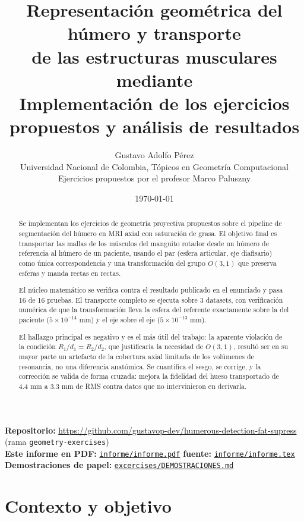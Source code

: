 \documentclass[11pt,a4paper]{article}
\title{\vspace{-1.5cm}\textbf{Representación geométrica del húmero y transporte\\
de las estructuras musculares mediante \Ot}\\[0.35cm]
\large Implementación de los ejercicios propuestos y análisis de resultados}
\author{Gustavo Adolfo Pérez\\
\small Universidad Nacional de Colombia, Tópicos en Geometría Computacional\\
\small Ejercicios propuestos por el profesor Marco Paluszny}
\date{\today}
\newcommand{\ghrepo}{https://github.com/gustavop-dev/humerous-detection-fat-supress}
\newcommand{\ghbranch}{geometry-exercises}
\newcommand{\ghblob}{\ghrepo/blob/\ghbranch}
\newcommand{\ghl}[2]{\href{\ghblob/#1}{#2}}
\newcommand{\Ot}{\ensuremath{O(3,1)}}
\begin{document}
\maketitle

\begin{abstract}
\noindent
Se implementan los ejercicios de geometría proyectiva propuestos sobre el pipeline de
segmentación del húmero en MRI axial con saturación de grasa. El objetivo final es
transportar las mallas de los músculos del manguito rotador desde un húmero de referencia
al húmero de un paciente, usando el par (esfera articular, eje diafisario) como única
correspondencia y una transformación del grupo \Ot{} que preserva esferas y manda rectas
en rectas.

El núcleo matemático se verifica contra el resultado publicado en el enunciado y pasa
16 de 16 pruebas. El transporte completo se ejecuta sobre 3 datasets, con verificación
numérica de que la transformación lleva la esfera del referente exactamente sobre la del
paciente ($5\times10^{-14}$ mm) y el eje sobre el eje ($5\times10^{-13}$ mm).

El hallazgo principal es negativo y es el más útil del trabajo: la aparente violación de
la condición $R_1/d_1 = R_2/d_2$, que justificaría la necesidad de \Ot{}, resultó ser
en su mayor parte un artefacto de la cobertura axial limitada de los volúmenes de
resonancia, no una diferencia anatómica. Se cuantifica el sesgo, se corrige, y la
corrección se valida de forma cruzada: mejora la fidelidad del hueso transportado de
4.4 mm a 3.3 mm de RMS contra datos que no intervinieron en derivarla.
\end{abstract}

\vspace{-0.3cm}
\begin{center}
\colorbox{grisclaro}{\parbox{0.94\textwidth}{\small
\textbf{Repositorio:} \url{\ghrepo} \quad(rama \texttt{\ghbranch})\\[2pt]
\textbf{Este informe en PDF:} \ghl{informe/informe.pdf}{\texttt{informe/informe.pdf}}
\quad\textbf{fuente:} \ghl{informe/informe.tex}{\texttt{informe/informe.tex}}\\[2pt]
\textbf{Demostraciones de papel:} \ghl{excercises/DEMOSTRACIONES.md}{\texttt{excercises/DEMOSTRACIONES.md}}
}}
\end{center}

\section{Contexto y objetivo}
\end{document}

